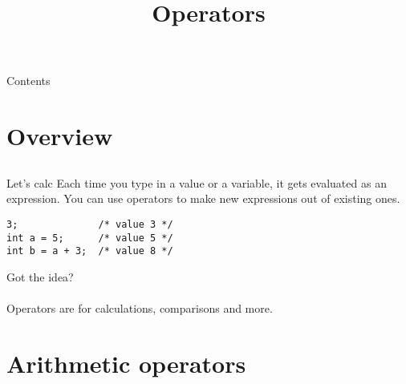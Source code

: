 
\newcommand{\topic}{
	Operators
}

\title{\topic}
\supertitle{\course}
\date{}



\maketitle

\begin{frame}{Contents}
	\tableofcontents
\end{frame}

\section{Overview}
\subsection{}
\begin{frame}[fragile]{Let's calc}
	Each time you type in a value or a variable, it gets evaluated as an expression. You can use operators to make new expressions out of existing ones.
	\begin{lstlisting}[numbers=none]
3;				/* value 3 */
int a = 5; 		/* value 5 */
int b = a + 3;	/* value 8 */
\end{lstlisting}
Got the idea?\\
\ \\Operators are for calculations, comparisons and more.
\end{frame}
\section{Arithmetic operators}
